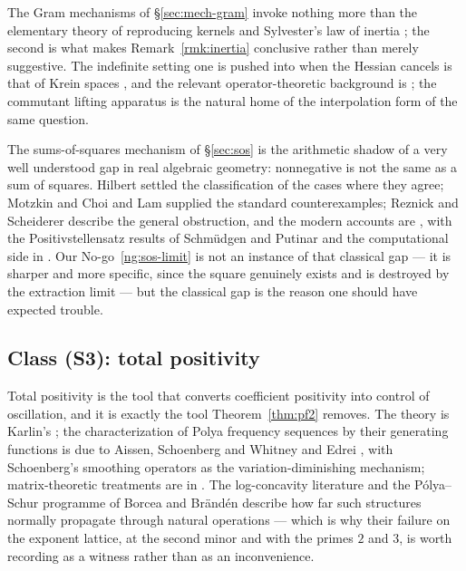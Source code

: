 \documentclass[11pt]{amsart}
\theoremstyle{definition}
\theoremstyle{remark}
\theoremstyle{definition}
\begin{document}
The Gram mechanisms of \S\ref{sec:mech-gram} invoke nothing more than the elementary theory of
reproducing kernels \cite{Aronszajn} and Sylvester's law of inertia \cite{HornJohnson}; the second
is what makes Remark~\ref{rmk:inertia} conclusive rather than merely suggestive. The indefinite
setting one is pushed into when the Hessian cancels is that of Krein spaces \cite{Bognar}, and the
relevant operator-theoretic background is \cite{ReedSimon,Simon,Davies}; the commutant lifting
apparatus \cite{FoiasFrazho} is the natural home of the interpolation form of the same question.

The sums-of-squares mechanism of \S\ref{sec:sos} is the arithmetic shadow of a very well understood
gap in real algebraic geometry: nonnegative is not the same as a sum of squares. Hilbert
\cite{Hilbert1888} settled the classification of the cases where they agree; Motzkin
\cite{Motzkin} and Choi and Lam \cite{ChoiLam} supplied the standard counterexamples;
Reznick \cite{Reznick} and Scheiderer \cite{Scheiderer} describe the general obstruction, and the
modern accounts are \cite{Marshall,PrestelDelzell,Blekherman}, with the Positivstellensatz results
of Schm\"udgen \cite{Schmudgen} and Putinar \cite{Putinar} and the computational side in
\cite{Lasserre,Parrilo}. Our No-go~\ref{ng:sos-limit} is not an instance of that classical gap ---
it is sharper and more specific, since the square genuinely exists and is destroyed by the
extraction limit --- but the classical gap is the reason one should have expected trouble.

\subsection{Class (S3): total positivity}

Total positivity is the tool that converts coefficient positivity into control of oscillation, and
it is exactly the tool Theorem~\ref{thm:pf2} removes. The theory is Karlin's \cite{Karlin}; the
characterization of Polya frequency sequences by their generating functions is due to Aissen,
Schoenberg and Whitney \cite{ASW} and Edrei \cite{Edrei}, with Schoenberg's smoothing operators
\cite{Schoenberg} as the variation-diminishing mechanism; matrix-theoretic treatments are in
\cite{FallatJohnson}. The log-concavity literature \cite{Stanley,BrandenSurvey} and the
P\'olya--Schur programme of Borcea and Br\"and\'en \cite{BorceaBranden} describe how far such
structures normally propagate through natural operations --- which is why their failure on the
exponent lattice, at the second minor and with the primes $2$ and $3$, is worth recording as a
witness rather than as an inconvenience.
\end{document}
